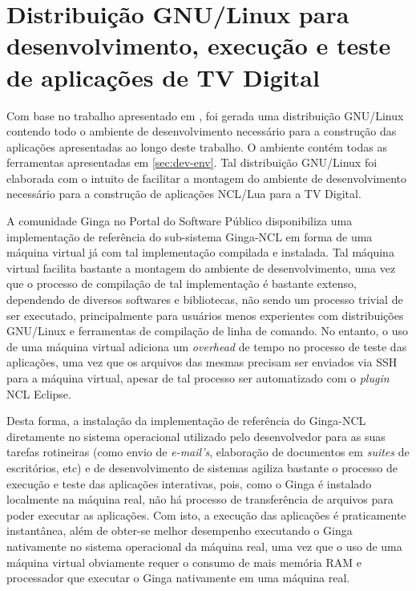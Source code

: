 \section[Distribuição GNU/Linux p/ desenvolvimento de aplicações]{Distribuição GNU/Linux para desenvolvimento, execução e teste de aplicações de TV Digital}

Com base no trabalho apresentado em \cite{soset}, foi gerada uma distribuição GNU/Linux
contendo todo o ambiente de desenvolvimento necessário para a construção das
aplicações apresentadas ao longo deste trabalho.
O ambiente contém todas as ferramentas apresentadas em \ref{sec:dev-env}. 
Tal distribuição GNU/Linux foi
elaborada com o intuito de facilitar a montagem do ambiente de desenvolvimento
necessário para a construção de aplicações NCL/Lua para a TV Digital.

A comunidade Ginga no Portal do Software Público disponibiliza
uma implementação de referência do sub-sistema Ginga-NCL em forma
de uma máquina virtual já com tal implementação compilada e instalada. 
Tal máquina virtual facilita bastante a montagem do ambiente
de desenvolvimento, uma vez que o processo de compilação
de tal implementação é bastante extenso, dependendo de diversos
softwares e bibliotecas, não sendo um processo trivial de 
ser executado, principalmente para usuários menos
experientes com distribuições GNU/Linux e ferramentas
de compilação de linha de comando. No entanto,
o uso de uma máquina virtual adiciona um \textit{overhead} 
de tempo no processo de teste das aplicações, uma vez
que os arquivos das mesmas precisam ser enviados via SSH para a máquina
virtual, apesar de tal processo ser automatizado com o \textit{plugin} NCL Eclipse.

Desta forma, a instalação da implementação de referência do Ginga-NCL diretamente no 
sistema operacional utilizado pelo desenvolvedor para as suas tarefas rotineiras
(como envio de \textit{e-mail's}, elaboração de documentos em \textit{suites} de escritórios, etc) 
e de desenvolvimento de sistemas agiliza bastante o processo de execução e teste
das aplicações interativas, pois, como o Ginga é instalado localmente na máquina real,
não há processo de transferência de arquivos para poder executar as aplicações.
Com isto, a execução das aplicações é praticamente instantânea, além de
obter-se melhor desempenho executando o Ginga nativamente no sistema 
operacional da máquina real, uma vez que o uso de uma máquina
virtual obviamente requer o consumo de mais memória RAM e processador
que executar o Ginga nativamente em uma máquina real.

